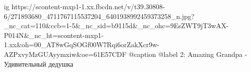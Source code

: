  
 
 
 
 

\ifcmt
  ig https://scontent-mxp1-1.xx.fbcdn.net/v/t39.30808-6/271893680_4711767115537204_6401938992459373258_n.jpg?_nc_cat=110&ccb=1-5&_nc_sid=b9115d&_nc_ohc=9EsZWT9jT3wAX-P014N&_nc_ht=scontent-mxp1-1.xx&oh=00_AT8wGqSOGf00W7Rqi6orZakXcr9w-AZPxvyMzGUAyymxiw&oe=61E57CDF
  @caption @label 2: Amazing Grandpa - Удивительный дедушка
\fi
